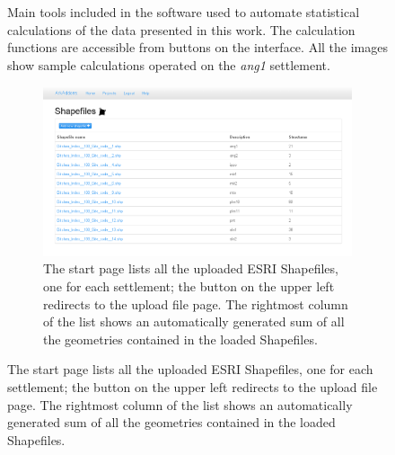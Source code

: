             \vfill

            \begin{figure}[H]
                \caption[Screenshots of the main tools of the software created to automate statistical calculations]{Main tools included in the software used to automate statistical calculations of the data presented in this work. The calculation functions are accessible from buttons on the interface. All the images show sample calculations operated on the \emph{ang1} settlement.}
                \label{fig:screenshots}
            \end{figure}

            \vfill

            \begin{figure}[H]
                \ContinuedFloat
                \begin{subfigure}[b]{1\textwidth}
                    \centering
                    \includegraphics[width=1\textwidth]{img/shp-list}
                    \caption{The start page lists all the uploaded ESRI Shapefiles, one for each settlement; the button on the upper left redirects to the upload file page. The rightmost column of the list shows an automatically generated sum of all the geometries contained in the loaded Shapefiles.}
                    \label{fig:shp-list}
                \end{subfigure}
            \end{figure}

            \vfill

